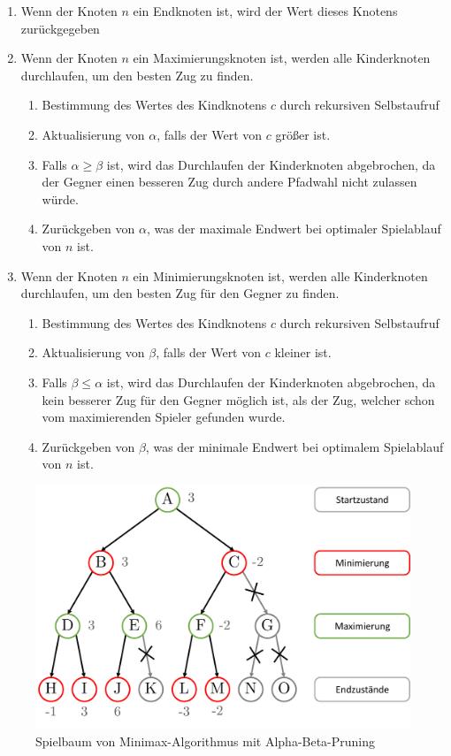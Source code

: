 \begin{enumerate}
    \item Wenn der Knoten $n$ ein Endknoten ist, wird der Wert dieses Knotens zurückgegeben
    \item Wenn der Knoten $n$ ein Maximierungsknoten ist, werden alle Kinderknoten durchlaufen, um den besten Zug zu finden.
          \begin{enumerate}
              \item Bestimmung des Wertes des Kindknotens $c$ durch rekursiven Selbstaufruf
              \item Aktualisierung von $\alpha$, falls der Wert von $c$ größer ist.
              \item Falls $\alpha \geq \beta$ ist, wird das Durchlaufen der Kinderknoten abgebrochen, da der Gegner einen besseren Zug durch andere Pfadwahl nicht zulassen würde.
              \item Zurückgeben von $\alpha$, was der maximale Endwert bei optimaler Spielablauf von $n$ ist.
          \end{enumerate}
    \item Wenn der Knoten $n$ ein Minimierungsknoten ist, werden alle Kinderknoten durchlaufen, um den besten Zug für den Gegner zu finden.
          \begin{enumerate}
              \item Bestimmung des Wertes des Kindknotens $c$ durch rekursiven Selbstaufruf
              \item Aktualisierung von $\beta$, falls der Wert von $c$ kleiner ist.
              \item Falls $\beta \leq \alpha$ ist, wird das Durchlaufen der Kinderknoten abgebrochen, da kein besserer Zug für den Gegner möglich ist, als der Zug, welcher schon vom maximierenden Spieler  gefunden wurde.
              \item Zurückgeben von $\beta$, was der minimale Endwert bei optimalem Spielablauf von $n$ ist.
          \end{enumerate}
\end{enumerate}

\begin{figure}[!ht]
    \centering
    \includegraphics[width=\textwidth]{res/pictures/minimax-tree-with-a-b-pruning.pdf}
    \caption{Spielbaum von Minimax-Algorithmus mit Alpha-Beta-Pruning}
    \label{fig:minimax-a-b-tree}
\end{figure}

